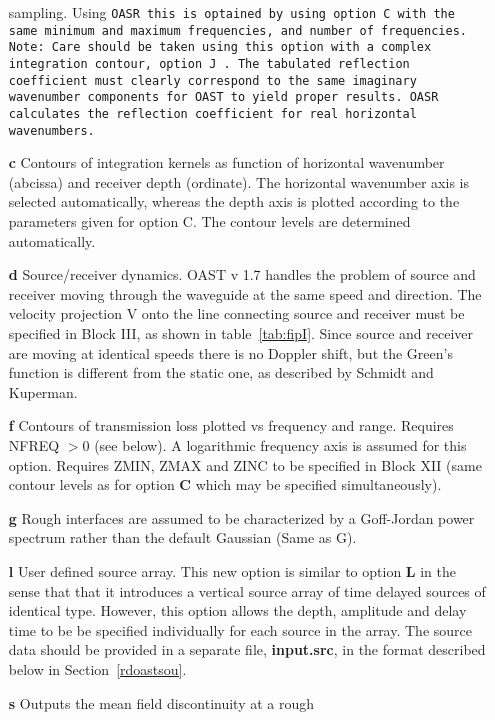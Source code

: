 \begin{itemize}
sampling. Using \tt OASR \rm this is optained by using option \tt C
\rm with the same minimum and maximum frequencies, and number of frequencies.
Note: Care should be taken using this option with a complex
integration contour, option \tt J \rm. The tabulated reflection
coefficient must clearly correspond to the same imaginary wavenumber
components for \tt OAST \rm to yield proper results. \tt OASR \rm calculates
the reflection coefficient for real horizontal wavenumbers.
    \item[{\bf c}]     Contours   of  integration  kernels  as   function   of 
          horizontal  wavenumber  (abcissa)  and  receiver  depth           
          (ordinate). The horizontal wavenumber axis is  selected           
          automatically,  whereas  the  depth  axis  is   plotted           
          according  to  the parameters given for option  C.  The           
          contour levels are determined automatically.
\item[{\bf d}] Source/receiver dynamics. OAST v 1.7 handles the problem of
source and receiver moving through the waveguide at the same speed and
direction. The velocity projection V onto the line connecting source
and  receiver must be specified in Block III, as shown in
table~\ref{tab:fipI}. Since source and receiver are moving at identical
speeds there is no Doppler shift, but the Green's function is
different from the static one, as described by Schmidt and
Kuperman\cite{sk:jasa94}.  
    \item[{\bf f}] Contours of transmission loss plotted vs frequency
and range. Requires NFREQ $> 0$ (see below). A logarithmic frequency
axis is assumed for this option. Requires ZMIN, ZMAX and ZINC to be
specified in Block XII (same contour levels as for option {\bf C}
which may be specified simultaneously). 
    \item[{\bf g}] Rough interfaces are assumed to be characterized by
a Goff-Jordan power spectrum rather than the default Gaussian (Same as G). 
    \item[{\bf l}] User defined source array. This new option is
similar to option {\bf L} in the sense that that it introduces a
vertical source array of time delayed sources of identical type. However,
this option allows the depth, amplitude and  delay time to be be
specified individually for each source in the array. The source data
should be provided in a separate file, {\bf input.src}, in the format
described below in Section~\ref{rdoastsou}.
    \item[{\bf s}]     Outputs  the  mean  field  discontinuity  at  a   rough 

\end{itemize}

